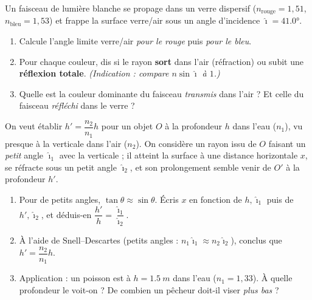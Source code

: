 \documentclass[11pt,a4paper]{article}
\begin{document}
\begin{exo}
Un faisceau de lumière blanche se propage dans un verre dispersif ($n_{\text{rouge}}=1{,}51$,
$n_{\text{bleu}}=1{,}53$) et frappe la surface verre/air sous un angle d'incidence
$\hat{\imath}=\ang{41.0}$.
\begin{enumerate}[label=\alph*)]
  \item Calcule l'angle limite verre/air \emph{pour le rouge} puis \emph{pour le bleu}.
  \item Pour chaque couleur, dis si le rayon \textbf{sort} dans l'air (réfraction) ou subit une
        \textbf{réflexion totale}. \emph{(Indication : compare $n\sin\hat{\imath}$ à $1$.)}
  \item Quelle est la couleur dominante du faisceau \emph{transmis} dans l'air ? Et celle du faisceau
        \emph{réfléchi} dans le verre ?
\end{enumerate}
\end{exo}

\begin{exo}
On veut établir $h'=\dfrac{n_2}{n_1}h$ pour un objet $O$ à la profondeur $h$ dans l'eau ($n_1$), vu
presque à la verticale dans l'air ($n_2$). On considère un rayon issu de $O$ faisant un \emph{petit}
angle $\hat{\imath}_1$ avec la verticale ; il atteint la surface à une distance horizontale $x$, se
réfracte sous un petit angle $\hat{\imath}_2$, et son prolongement semble venir de $O'$ à la
profondeur $h'$.
\begin{enumerate}[label=\alph*)]
  \item Pour de petits angles, $\tan\theta\approx\sin\theta$. Écris $x$ en fonction de $h,\hat{\imath}_1$
        puis de $h',\hat{\imath}_2$, et déduis-en $\dfrac{h'}{h}=\dfrac{\hat{\imath}_1}{\hat{\imath}_2}$.
  \item À l'aide de Snell–Descartes (petits angles : $n_1\hat{\imath}_1\approx n_2\hat{\imath}_2$),
        conclus que $h'=\dfrac{n_2}{n_1}h$.
  \item Application : un poisson est à $h=\qty{1.5}{m}$ dans l'eau ($n_1=1{,}33$). À quelle profondeur
        le voit-on ? De combien un pêcheur doit-il viser \emph{plus bas} ?
\end{enumerate}
\end{exo}
\end{document}
